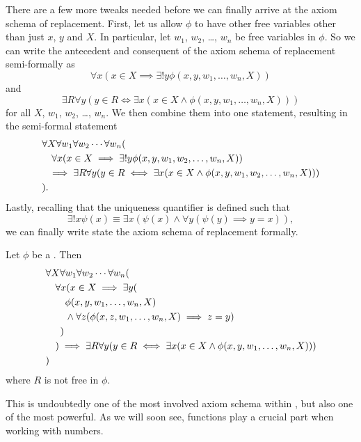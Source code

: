 There are a few more tweaks needed before we can finally arrive at the axiom schema of replacement. First, let us allow $\phi$ to have other free variables other than just $x$, $y$ and $X$. In particular, let $w_1$, $w_2$, \dots, $w_n$ be free variables in $\phi$. So we can write the antecedent and consequent of the axiom schema of replacement semi-formally as
\[
    \forall x (x \in X \implies \exists! y \phi(x, y, w_1, \dots, w_n, X))
\]
and
\[
    \exists R \forall y (y \in R \iff \exists x (x \in X \land \phi(x, y, w_1, \dots, w_n, X)))
\]
for all $X$, $w_1$, $w_2$, \dots, $w_n$. We then combine them into one statement, resulting in the semi-formal statement
\begin{align*}
    &\forall X \forall w_1 \forall w_2 \cdots \forall w_n (\\
    &\quad \forall x (x \in X \implies \exists! y \phi(x, y, w_1, w_2, \dots, w_n, X))\\
    &\hskip0.5em\relax\implies \exists R \forall y (y \in R \iff \exists x (x \in X \land \phi(x, y, w_1, w_2, \dots, w_n, X)))\\
    &).
\end{align*}
Lastly, recalling that the uniqueness quantifier is defined such that
\[
    \exists! x \psi(x) \equiv \exists x (\psi(x) \land \forall y (\psi(y) \implies y = x)),
\]
we can finally write state the axiom schema of replacement formally.

\begin{axiom}\label{axiom:schema-of-replacement}
    Let $\phi$ be a \wff. Then
    \begin{align*}
        &\forall X \forall w_1 \forall w_2 \cdots \forall w_n (\\
        &\quad \forall x (x \in X \implies \exists y (\\
        &\quad\quad \phi(x, y, w_1, \dots, w_n, X)\\
        &\quad\quad\land \forall z (\phi(x, z, w_1, \dots, w_n, X) \implies z = y)\\
        &\quad\hskip0.5em\relax)\\
        &\quad)\implies \exists R \forall y (y \in R \iff \exists x (x \in X \land \phi(x, y, w_1, \dots, w_n, X)))\\
        &)
    \end{align*}
    where $R$ is not free in $\phi$.
\end{axiom}

This is undoubtedly one of the most involved axiom schema within \ZFC, but also one of the most powerful. As we will soon see, functions play a crucial part when working with numbers.

